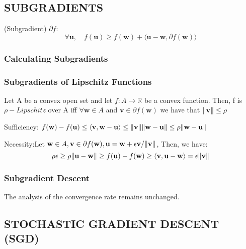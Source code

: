 \subsection{SUBGRADIENTS}
\begin{defn} (Subgradient) $ \partial f $:
	\begin{equation}
		\forall \mathbf{u}, \quad
		f(\mathbf{u}) \ge f(\mathbf{w}) + \langle \mathbf{u}-\mathbf{w}, \partial f(\mathbf{w}) \rangle
	\end{equation}
\end{defn}
\subsubsection{Calculating Subgradients}
\subsubsection{Subgradients of Lipschitz Functions}
\begin{lem}
	Let A be a convex open set and let $ f:A\rightarrow \mathbb{R} $ be a convex function.
	Then, f is $ \rho-Lipschitz $ over A iff $ \forall \mathbf{w} \in A $ and $ \mathbf{v} \in \partial f(\mathbf{w}) $
	we have that $ \Arrowvert \mathbf{v} \Arrowvert \le \rho $

	Sufficiency:
	$ f(\mathbf{w}) - f(\mathbf{u}) \le 
	\langle \mathbf{v}, \mathbf{w}-\mathbf{u} \rangle
	\le \Arrowvert \mathbf{v} \Arrowvert \Arrowvert \mathbf{w} - \mathbf{u} \Arrowvert
	\le \rho\Arrowvert \mathbf{w} - \mathbf{u} \Arrowvert$

	Necessity:Let $ \mathbf{w} \in A, \mathbf{v} \in \partial f(\mathbf{w}), 
	\mathbf{u} = \mathbf{w} + \epsilon \mathbf{v} / \Arrowvert \mathbf{v} \Arrowvert $, 
	Then, we have:
	\[ \rho \epsilon \ge \rho \Arrowvert \mathbf{u} - \mathbf{w} \Arrowvert \ge f(\mathbf{u}) - f(\mathbf{w})
	\ge \langle \mathbf{v, \mathbf{u} - \mathbf{w}} \rangle = \epsilon \Arrowvert \mathbf{v} \Arrowvert \]
\end{lem}

\subsubsection{Subgradient Descent}
The analysis of the convergence rate remains unchanged.

\subsection{STOCHASTIC GRADIENT DESCENT (SGD)}

